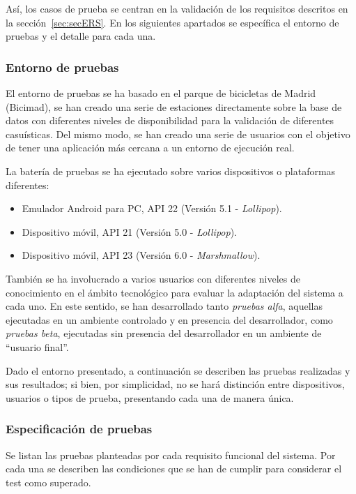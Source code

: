 Así, los casos de prueba se centran en la validación de los requisitos descritos en la sección~\ref{sec:secERS}. En los siguientes apartados se específica el entorno de pruebas y el detalle para cada una.

\subsubsection{Entorno de pruebas}

El entorno de pruebas se ha basado en el parque de bicicletas de Madrid (Bicimad), se han creado una serie de estaciones directamente sobre la base de datos con diferentes niveles de disponibilidad para la validación de diferentes casuísticas. Del mismo modo, se han creado una serie de usuarios con el objetivo de tener una aplicación más cercana a un entorno de ejecución real.

La batería de pruebas se ha ejecutado sobre varios dispositivos o plataformas diferentes:

\begin{itemize}
	\item Emulador Android para PC, API 22 (Versión 5.1 - \textit{Lollipop}).
	\item Dispositivo móvil, API 21 (Versión 5.0 - \textit{Lollipop}).
	\item Dispositivo móvil, API 23 (Versión 6.0 - \textit{Marshmallow}).
\end{itemize}

También se ha involucrado a varios usuarios con diferentes niveles de conocimiento en el ámbito tecnológico para evaluar la adaptación del sistema a cada uno. En este sentido, se han desarrollado tanto \emph{pruebas alfa}, aquellas ejecutadas en un ambiente controlado y en presencia del desarrollador, como \emph{pruebas beta}, ejecutadas sin presencia del desarrollador en un ambiente de ``usuario final''.

Dado el entorno presentado, a continuación se describen las pruebas realizadas y sus resultados; si bien, por simplicidad, no se hará distinción entre dispositivos, usuarios o tipos de prueba, presentando cada una de manera única.

\subsubsection{Especificación de pruebas}

Se listan las pruebas planteadas por cada requisito funcional del sistema. Por cada una se describen las condiciones que se han de cumplir para considerar el test como superado.

